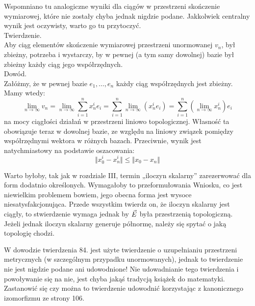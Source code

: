 \documentclass[a4paper,11pt]{article}
\numberwithin{equation}{section}
\begin{document}
\noindent
{} Wspomniano tu analogiczne wyniki dla ciągów w
przestrzeni skończenie wymiarowej, które nie zostały chyba jednak
nigdzie podane. Jakkolwiek centralny wynik jest oczywisty, warto
go tu przytoczyć. \\
Twierdzenie. \\
Aby ciąg elementów skończenie wymiarowej przestrzeni unormowanej
$v_{ n }$, był zbieżny, potrzeba i wystarczy, by w pewnej (a tym samy
dowolnej) bazie był zbieżny każdy ciąg jego
współrzędnych. \\
Dowód. \\
Załóżmy, że w pewnej bazie $e_{ 1 }, \ldots, e_{ n }$ każdy ciąg
współrzędnych jest zbieżny. Mamy wtedy:
\begin{equation}
  \label{eq:SchwartzKAMVolI-01}
  \lim\limits_{ n \to \infty } v_{ n }
  =
  \lim_{ n \to \infty } \sum_{ i = 1 }^{ n } x_{ n }^{ i } e_{ i }
  =
  \sum_{ i = 1 }^{ n } \lim\limits_{ n \to \infty }( x_{ n }^{ i } e_{ i } )
  =
  \sum_{ i = 1 }^{ n } ( \lim\limits_{ n \to \infty } x_{ n }^{ i } ) e_{ i }
\end{equation}
na mocy ciągłości działań w przestrzeni liniowo topologicznej.
Własność ta obowiązuje teraz w dowolnej bazie, ze względu na liniowy
związek pomiędzy współrzędnymi wektora w różnych bazach. Przeciwnie,
wynik jest natychmiastowy na podstawie oszacowania:
\begin{equation}
  \label{eq:SchwartzKAMVolI-02}
  \Vert x_{ 0 }^{ i } - x_{ n }^{ i } \Vert \leq \Vert x_{ 0 } - x_{ n } \Vert
\end{equation}

\VerSpaceFour





\noindent
{} Warto byłoby, tak jak w rozdziale III, termin
„iloczyn skalarny” zarezerwować dla form dodatnio określonych.
Wymagałoby to przeformułowania Wniosku, co jest niewielkim problemem
bowiem, jego obecna forma jest wysoce niesatysfakcjonująca. Przede
wszystkim twierdz on, że iloczyn skalarny jest ciągły, to stwierdzenie
wymaga jednak by $\vec{E}$ była przestrzenią topologiczną. Jeżeli
jednak iloczyn skalarny generuje półnormę, należy się spytać o jaką
topologię chodzi.

\VerSpaceFour





\noindent
{} W dowodzie twierdzenia 84. jest użyte twierdzenie o
uzupełnianiu przestrzeni metrycznych (w szczególnym przypadku
unormowanych), jednak to twierdzenie nie jest nigdzie podane ani
udowodnione! Nie udowadnianie tego twierdzenia i powoływanie się na
nie, jest chyba jakąś tradycją książek do matematyki. Zastanowić się
czy można to twierdzenie udowodnić korzystając z kanonicznego
izomorfizmu ze strony 106.
\end{document}
